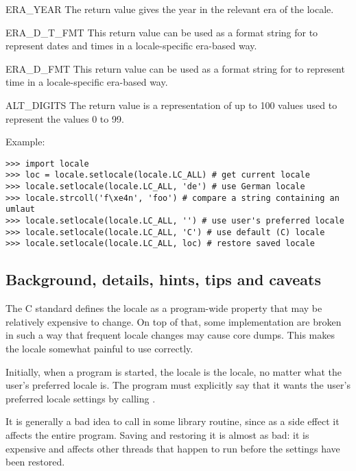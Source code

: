 \begin{datadesc}{ERA_YEAR}
The return value gives the year in the relevant era of the locale.
\end{datadesc}

\begin{datadesc}{ERA_D_T_FMT}
This return value can be used as a format string for
 to represent dates and times in a locale-specific
era-based way.
\end{datadesc}

\begin{datadesc}{ERA_D_FMT}
This return value can be used as a format string for
 to represent time in a locale-specific era-based
way.
\end{datadesc}

\begin{datadesc}{ALT_DIGITS}
The return value is a representation of up to 100 values used to
represent the values 0 to 99.
\end{datadesc}

Example:

\begin{verbatim}
>>> import locale
>>> loc = locale.setlocale(locale.LC_ALL) # get current locale
>>> locale.setlocale(locale.LC_ALL, 'de') # use German locale
>>> locale.strcoll('f\xe4n', 'foo') # compare a string containing an umlaut 
>>> locale.setlocale(locale.LC_ALL, '') # use user's preferred locale
>>> locale.setlocale(locale.LC_ALL, 'C') # use default (C) locale
>>> locale.setlocale(locale.LC_ALL, loc) # restore saved locale
\end{verbatim}


\subsection{Background, details, hints, tips and caveats}

The C standard defines the locale as a program-wide property that may
be relatively expensive to change.  On top of that, some
implementation are broken in such a way that frequent locale changes
may cause core dumps.  This makes the locale somewhat painful to use
correctly.

Initially, when a program is started, the locale is the  locale, no
matter what the user's preferred locale is.  The program must
explicitly say that it wants the user's preferred locale settings by
calling .

It is generally a bad idea to call  in some library
routine, since as a side effect it affects the entire program.  Saving
and restoring it is almost as bad: it is expensive and affects other
threads that happen to run before the settings have been restored.


